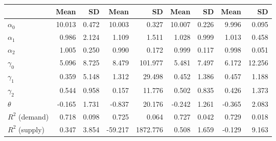 
\begin{tabular}[t]{lrrrrrrrr}
\toprule
  & Mean & SD & Mean  & SD  & Mean   & SD   & Mean    & SD   \\
\midrule
$\alpha_{0}$ & 10.013 & 0.472 & 10.003 & 0.327 & 10.007 & 0.226 & 9.996 & 0.095\\
$\alpha_{1}$ & 0.986 & 2.124 & 1.109 & 1.511 & 1.028 & 0.999 & 1.013 & 0.458\\
$\alpha_{2}$ & 1.005 & 0.250 & 0.990 & 0.172 & 0.999 & 0.117 & 0.998 & 0.051\\
$\gamma_{0}$ & 5.096 & 8.725 & 8.479 & 101.977 & 5.481 & 7.497 & 6.172 & 12.256\\
$\gamma_{1}$ & 0.359 & 5.148 & 1.312 & 29.498 & 0.452 & 1.386 & 0.457 & 1.188\\
$\gamma_{2}$ & 0.544 & 0.958 & 0.157 & 11.776 & 0.502 & 0.835 & 0.426 & 1.373\\
$\theta$ & -0.165 & 1.731 & -0.837 & 20.176 & -0.242 & 1.261 & -0.365 & 2.083\\
$R^{2}$ (demand) & 0.718 & 0.098 & 0.725 & 0.064 & 0.727 & 0.042 & 0.729 & 0.018\\
$R^{2}$ (supply) & 0.347 & 3.854 & -59.217 & 1872.776 & 0.508 & 1.659 & -0.129 & 9.163\\
\bottomrule
\end{tabular}
